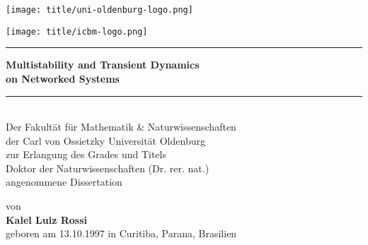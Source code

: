 \begin{titlepage}
    \centering
    \begin{minipage}{0.4\textwidth}
        \centering
        \texttt{[image: title/uni-oldenburg-logo.png]}  %
    \end{minipage}
    \hfill
    \begin{minipage}{0.4\textwidth}
        \centering
        \texttt{[image: title/icbm-logo.png]}  %
    \end{minipage}
    
    \vspace*{2.0cm}
    {
        \noindent\rule{\textwidth}{0.4mm}  %
    \vspace{0.4cm}
    \huge \textbf{Multistability and Transient Dynamics \\[0.25cm] on Networked Systems}
    \vspace{0.4cm}
    \noindent\rule{\textwidth}{0.4mm}  %
    }
    \\[2.2cm]  %
    
    
    \vspace*{2.8cm}  %
    {\large Der Fakultät für Mathematik \& Naturwissenschaften \\[0.25cm]
    der Carl von Ossietzky Universität Oldenburg \\[0.25cm]
    zur Erlangung des Grades und Titels \\[0.25cm]
    Doktor der Naturwissenschaften (Dr. rer. nat.) \\[0.25cm]
    angenommene Dissertation}
    
	\vfill
    {\large von \\[0.28cm]
    \textbf{Kalel Luiz Rossi} \\[0.28cm]
    geboren am 13.10.1997 in Curitiba, Parana, Brasilien}
    
    
\end{titlepage}

